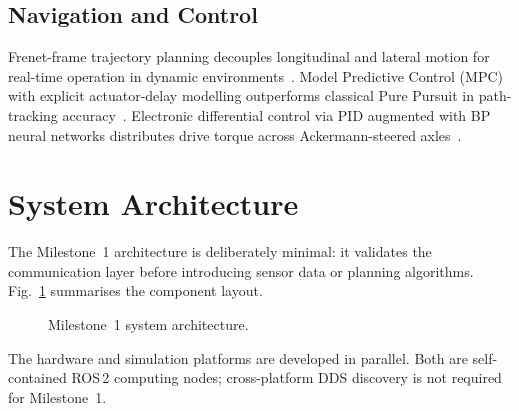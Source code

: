 \documentclass[conference]{IEEEtran}
\begin{document}
\subsection{Navigation and Control}
Frenet-frame trajectory planning decouples longitudinal and lateral motion for
real-time operation in dynamic environments~\cite{Wang2020}. Model Predictive
Control (MPC) with explicit actuator-delay modelling outperforms classical Pure
Pursuit in path-tracking accuracy~\cite{Li2022}. Electronic differential control
via PID augmented with BP neural networks distributes drive torque across
Ackermann-steered axles~\cite{Zhang2022}.

\section{System Architecture}
\label{sec:arch}

The Milestone~1 architecture is deliberately minimal: it validates the
communication layer before introducing sensor data or planning algorithms.
Fig.~\ref{fig:arch} summarises the component layout.

\begin{figure}[htbp]
  \centering
  \caption{Milestone~1 system architecture.}
  \label{fig:arch}
\end{figure}

The hardware and simulation platforms are developed in parallel. Both are
self-contained ROS\,2 computing nodes; cross-platform DDS discovery is not
required for Milestone~1.

\end{document}

